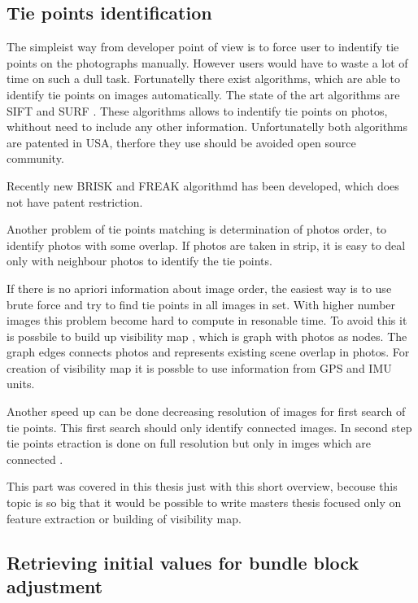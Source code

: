 \documentclass[a4paper,12pt]{report}
\begin{document}
\subsection{Tie points identification}

The simpleist way from developer point of view is to force user to indentify tie points on 
the photographs manually. However users would have to waste a lot of time on such a 
dull task. Fortunatelly there  exist algorithms, which are able to identify tie points on images
automatically. The state of the art algorithms are SIFT \cite{wiki:SIFT} and SURF \cite{wiki:SURF}.
These algorithms allows to indentify tie points on photos, whithout need to include any other information.
Unfortunatelly both algorithms are patented in USA, therfore they use should be avoided open source community.

Recently new BRISK \cite{leutenegger2011brisk} and FREAK \cite{alahi2012freak} algorithmd 
has been developed, which does not have patent restriction. 

Another problem of tie points matching is determination of photos order, to identify photos with some overlap. 
If photos are taken in strip, it is easy to deal only with neighbour photos to identify the tie points.

If there is no apriori information about image order, the easiest way is to use brute force and 
try to find tie points in all images in set. With higher number images this problem become 
hard to compute in resonable time. To avoid this it is possbile to build up visibility map \cite{barazzetti2010extraction}, 
which is graph with photos as nodes. The graph edges connects photos and represents existing scene overlap 
in photos. For creation of visibility map it is possble to use information from GPS and IMU units.

Another speed up can be done decreasing resolution of images 
for first search of tie points. This first search should only identify connected images.
In second step tie points etraction is done on full resolution but only in imges which 
are connected .

This part was covered in this thesis just with this short overview, becouse this topic is so big 
that it would be possible to write masters thesis focused only on feature extraction or building 
of visibility map.


\subsection{Retrieving initial values for bundle block adjustment}
\end{document}
